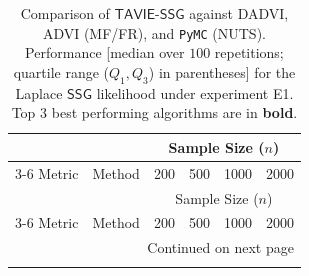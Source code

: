 \documentclass[12pt]{article}
\numberwithin{equation}{section}
\newcommand{\tssg}{\mathsf{TAVIE}\text{-}\mathsf{SSG}}
\begin{document}
{\scriptsize
\setlength{\tabcolsep}{3pt} %
\renewcommand{\arraystretch}{1.15}%
\begin{longtable}{llcccc}
\caption{\footnotesize{Comparison of $\tssg$ against DADVI, ADVI (MF/FR), and \texttt{PyMC} (NUTS). Performance [median over $100$ repetitions; quartile range ($Q_1, Q_3$)  in parentheses] for the Laplace $\mathsf{SSG}$ likelihood under experiment E1. { Top $3$ best performing algorithms are in \textbf{bold}.}}}
\label{tab:laplace_singlep_multin}\\
\toprule
\toprule
 &  & \multicolumn{4}{c}{Sample Size ($n$)} \\
\cmidrule(lr){3-6}
Metric & Method & 200 & 500 & 1000 & 2000 \\
\midrule
\endfirsthead
\toprule
 &  & \multicolumn{4}{c}{Sample Size ($n$)} \\
\cmidrule(lr){3-6}
Metric & Method & 200 & 500 & 1000 & 2000 \\
\midrule
\endhead
\midrule
\multicolumn{6}{r}{Continued on next page} \\
\midrule
\endfoot
\bottomrule
\endlastfoot


\end{longtable}}
\end{document}
